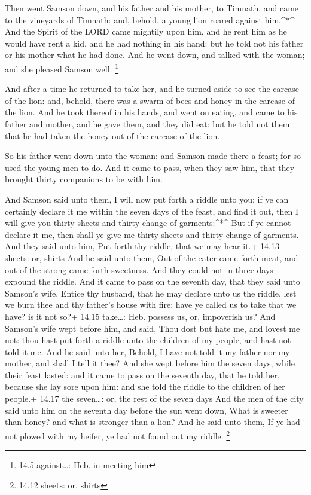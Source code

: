  Then went Samson down, and his father and his mother, to
Timnath, and came to the vineyards of Timnath: and, behold, a young lion
roared against him.\^{}*\^{}  And the Spirit of the LORD
came mightily upon him, and he rent him as he would have rent a kid, and
he had nothing in his hand: but he told not his father or his mother
what he had done.  And he went down, and talked with the
woman; and she pleased Samson well. \footnote{14.5 against\ldots: Heb.
  in meeting him}

 And after a time he returned to take her, and he turned
aside to see the carcase of the lion: and, behold, there was a swarm of
bees and honey in the carcase of the lion.  And he took
thereof in his hands, and went on eating, and came to his father and
mother, and he gave them, and they did eat: but he told not them that he
had taken the honey out of the carcase of the lion.

 So his father went down unto the woman: and Samson made
there a feast; for so used the young men to do.  And it
came to pass, when they saw him, that they brought thirty companions to
be with him.

 And Samson said unto them, I will now put forth a riddle
unto you: if ye can certainly declare it me within the seven days of the
feast, and find it out, then I will give you thirty sheets and thirty
change of garments:\^{}*\^{}  But if ye cannot declare it
me, then shall ye give me thirty sheets and thirty change of garments.
And they said unto him, Put forth thy riddle, that we may hear it.+
14.13 sheets: or, shirts  And he said unto them, Out of the
eater came forth meat, and out of the strong came forth sweetness. And
they could not in three days expound the riddle.  And it
came to pass on the seventh day, that they said unto Samson's wife,
Entice thy husband, that he may declare unto us the riddle, lest we burn
thee and thy father's house with fire: have ye called us to take that we
have? is it not so?+ 14.15 take\ldots: Heb. possess us, or, impoverish
us?  And Samson's wife wept before him, and said, Thou dost
but hate me, and lovest me not: thou hast put forth a riddle unto the
children of my people, and hast not told it me. And he said unto her,
Behold, I have not told it my father nor my mother, and shall I tell it
thee?  And she wept before him the seven days, while their
feast lasted: and it came to pass on the seventh day, that he told her,
because she lay sore upon him: and she told the riddle to the children
of her people.+ 14.17 the seven\ldots: or, the rest of the seven days
 And the men of the city said unto him on the seventh day
before the sun went down, What is sweeter than honey? and what is
stronger than a lion? And he said unto them, If ye had not plowed with
my heifer, ye had not found out my riddle. \footnote{14.12 sheets: or,
  shirts}

